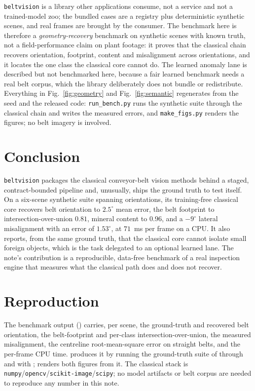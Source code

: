 \documentclass[journal]{IEEEtran}
\begin{document}
\texttt{beltvision} is a library other applications consume, not a service and not a
trained-model zoo; the bundled cases are a registry plus deterministic synthetic scenes, and real frames are
brought by the consumer. The benchmark here is therefore a \emph{geometry-recovery} benchmark on synthetic scenes
with known truth, not a field-performance claim on plant footage: it proves that the classical chain recovers
orientation, footprint, content and misalignment across orientations, and it locates the one class the classical
core cannot do. The learned anomaly lane is described but not benchmarked here, because a fair learned benchmark
needs a real belt corpus, which the library deliberately does not bundle or redistribute. Everything in
Fig.~\ref{fig:geometry} and Fig.~\ref{fig:semantic} regenerates from the seed and the released code:
\texttt{run\_bench.py} runs the synthetic suite through the classical chain and writes the measured errors, and
\texttt{make\_figs.py} renders the figures; no belt imagery is involved.

\section{Conclusion}

\texttt{beltvision} packages the classical conveyor-belt vision methods behind a staged, contract-bounded pipeline
and, unusually, ships the ground truth to test itself. On a six-scene synthetic suite spanning orientations, its
training-free classical core recovers belt orientation to $2.5^\circ$ mean error, the belt footprint to
intersection-over-union $0.81$, mineral content to $0.96$, and a $-9^\circ$ lateral misalignment with an error of
$1.53^\circ$, at $71$~ms per frame on a CPU. It also reports, from the same ground truth, that the classical
core cannot isolate small foreign objects, which is the task delegated to an optional learned lane. The note's
contribution is a reproducible, data-free benchmark of a real inspection engine that measures what the classical
path does and does not recover.

\balance

\appendices
\section{Reproduction}\label{app:repro}

{\raggedright
The benchmark output () carries, per scene, the ground-truth
and recovered belt orientation, the belt-footprint and per-class intersection-over-union, the measured
misalignment, the centreline root-mean-square error on straight belts, and the per-frame CPU time.
 produces it by running the ground-truth suite of 
through  and  with ;
 renders both figures from it. The classical stack is
\texttt{numpy}/\texttt{opencv}/\texttt{scikit-image}/\texttt{scipy}; no model artifacts or belt corpus are needed
to reproduce any number in this note.\par}
\end{document}
